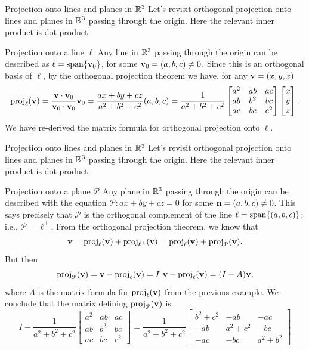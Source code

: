 \begin{frame}{Projection onto lines and planes in ${\mathbb R}^3$}
Let's revisit orthogonal projection onto lines and planes in ${\mathbb R}^3$ passing through the origin. Here the relevant inner product is dot product.  
\begin{block}{Projection onto a line $\ell$}
Any line in ${\mathbb R}^3$ passing through the origin can be described as $\ell=\operatorname{span}\{{\mathbf v}_0\}$, for some ${\mathbf v}_0=(a,b,c)\ne 0$. Since this is an orthogonal basis of $\ell$, by the orthogonal projection theorem we have, for any ${\mathbf v}=(x,y,z)$ 
\[
\mbox{proj}_{\ell}({{\mathbf v}})=\frac{{\mathbf v}\cdot {\mathbf v}_0}{{\mathbf v}_0\cdot{\mathbf v}_0}{\mathbf v}_0=\frac{ax+by+cz}{a^2+b^2+c^2}(a,b,c)=\frac{1}{a^2+b^2+c^2}\begin{bmatrix}
a^2&ab&ac\\
ab&b^2&bc\\
ac&bc&c^2
\end{bmatrix}\begin{bmatrix}x\\ y\\ z
\end{bmatrix}.
\] 
\pause We have re-derived the matrix formula for orthogonal projection onto $\ell$. 
\end{block}
\end{frame}
\begin{frame}{Projection onto lines and planes in ${\mathbb R}^3$}
Let's revisit orthogonal projection onto lines and planes in ${\mathbb R}^3$ passing through the origin. Here the relevant inner product is dot product.  
\begin{block}{Projection onto a plane $\mathcal{P}$}
Any plane in ${\mathbb R}^3$ passing through the origin can be described with the equation $\mathcal{P}\colon ax+by+cz=0$ for some ${\mathbf n}=(a,b,c)\ne 0$. This says precisely that $\mathcal{P}$ is the orthogonal complement of the line $\ell=\operatorname{span}\{(a,b,c)\}$: i.e., $\mathcal{P}=\ell^\perp$. 
\bpause
From the orthogonal projection theorem, we know that 
\[{\mathbf v}=\mbox{proj}_{\ell}({{\mathbf v}})+\mbox{proj}_{\ell^\perp}({{\mathbf v}})=\mbox{proj}_{\ell}({{\mathbf v}})+\mbox{proj}_{\mathcal{P}}({{\mathbf v}}).\] 
\pause 
But then
\[
\mbox{proj}_{\mathcal{P}}({{\mathbf v}})={\mathbf v}-\mbox{proj}_{\ell}({{\mathbf v}})=I \ {\mathbf v}-\mbox{proj}_{\ell}({{\mathbf v}})=(I-A){\mathbf v},
\] 
where $A$ is the matrix formula for $\mbox{proj}_{\ell}({{\mathbf v}})$ from the previous example. We conclude that   the matrix defining $\mbox{proj}_{\mathcal{P}}({{\mathbf v}})$ is 
\[
I-\frac{1}{a^2+b^2+c^2}\begin{bmatrix}
a^2&ab&ac\\
ab&b^2&bc\\
ac&bc&c^2
\end{bmatrix}=
\frac{1}{a^2+b^2+c^2}\begin{bmatrix}
b^2+c^2&-ab&-ac\\
-ab&a^2+c^2&-bc\\
-ac&-bc&a^2+b^2
\end{bmatrix}
\]
\end{block}
\end{frame}

